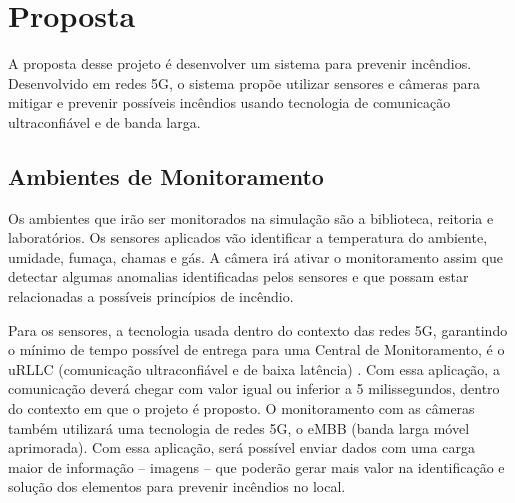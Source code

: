 \documentclass[12pt]{article}
\begin{document}
		
		\section{Proposta}
		
		A proposta desse projeto é desenvolver um sistema para prevenir incêndios. Desenvolvido em redes 5G, o sistema propõe utilizar sensores e câmeras para mitigar e prevenir possíveis incêndios usando tecnologia de comunicação ultraconfiável e de banda larga.

        \subsection{Ambientes de Monitoramento}
        
        Os ambientes que irão ser monitorados na simulação são a biblioteca, reitoria e laboratórios. Os sensores aplicados vão identificar a temperatura do ambiente, umidade, fumaça, chamas e gás. A câmera irá ativar o monitoramento assim que detectar algumas anomalias identificadas pelos sensores e que possam estar relacionadas a possíveis princípios de incêndio.

        Para os sensores, a tecnologia usada dentro do contexto das redes 5G, garantindo o mínimo de tempo possível de entrega para uma Central de Monitoramento, é o uRLLC (comunicação ultraconfiável e de baixa latência) \cite{3gpp23501,itu2017m2410}. Com essa aplicação, a comunicação deverá chegar com valor igual ou inferior a 5 milissegundos, dentro do contexto em que o projeto é proposto. O monitoramento com as câmeras também utilizará uma tecnologia de redes 5G, o eMBB (banda larga móvel aprimorada). Com essa aplicação, será possível enviar dados com uma carga maior de informação -- imagens -- que poderão gerar mais valor na identificação e solução dos elementos para prevenir incêndios no local.
\end{document}
